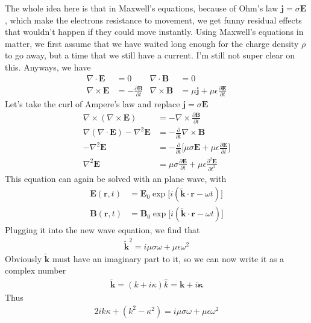 The whole idea here is that in Maxwell's equations, because of Ohm's law $\textbf{j} = \sigma\textbf{E}$, which make the electrons resistance to movement, we get funny residual effects that wouldn't happen if they could move instantly. Using Maxwell's equations in matter, we first assume that we have waited long enough for the charge density $\rho$ to go away, but a time that we still have a current. I'm still not super clear on this. Anyways, we have
\begin{align}
\nabla\cdot\textbf{E} &= 0& \nabla\cdot\textbf{B} &= 0\\
\nabla\times\textbf{E} &= -\frac{\partial\textbf{B}}{\partial t} &\nabla\times\textbf{B} &= \mu\textbf{j} + \mu\epsilon\frac{\partial\textbf{E}}{\partial t} 
\end{align}
Let's take the curl of Ampere's law and replace $\textbf{j} = \sigma\textbf{E}$
\begin{align}
\nabla\times(\nabla\times\textbf{E}) &= -\nabla\times\frac{\partial\textbf{B}}{\partial t}\\
\nabla(\nabla\cdot\textbf{E}) - \nabla^2\textbf{E} &= -\frac{\partial}{\partial t}\nabla\times\textbf{B}\\
-\nabla^2\textbf{E} &= -\frac{\partial}{\partial t}\Big[\mu\sigma\textbf{E}+ \mu\epsilon\frac{\partial\textbf{E}}{\partial t}\Big]\\
\nabla^2\textbf{E} &= \mu\sigma\frac{\partial\textbf{E}}{\partial t} + \mu\epsilon\frac{\partial^2\textbf{E}}{\partial t^2}\label{maxwellmatter}
\end{align}
This equation can again be solved with an plane wave, with
\begin{align}
\textbf{E}(\textbf{r},t) &= \textbf{E}_0\exp\Big[i(\tilde{\textbf{k}}\cdot\textbf{r}-\omega t)\Big]\\
\textbf{B}(\textbf{r},t) &= \textbf{B}_0\exp\Big[i(\tilde{\textbf{k}}\cdot\textbf{r}-\omega t)\Big]
\end{align}
Plugging it into the new wave equation, we find that
\begin{align}
\tilde{\textbf{k}}^2 = i\mu\sigma\omega + \mu\epsilon\omega^2
\end{align}
Obviously $\tilde{\textbf{k}}$ must have an imaginary part to it, so we can now write it as a complex number
\begin{align}
\tilde{\textbf{k}} = (k+i\kappa)\hat{k} = \textbf{k} + i\boldsymbol{\kappa}
\end{align}
Thus
\begin{align}
 2ik\kappa + (k^2 -\kappa^2) = i\mu\sigma\omega + \mu\epsilon\omega^2
\end{align}
